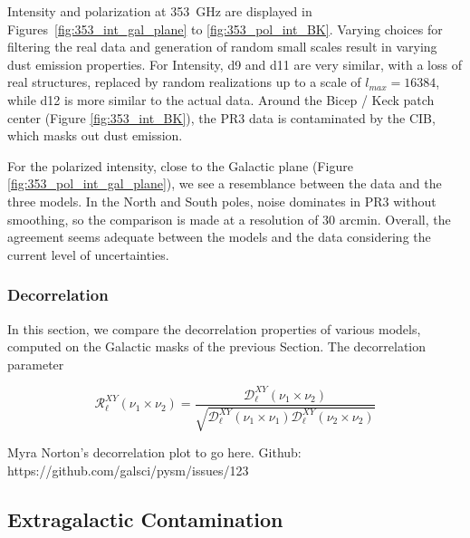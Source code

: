 \documentclass[twocolumn]{aastex631}
\begin{document}
Intensity and polarization at 353~GHz are displayed in Figures~\ref{fig:353_int_gal_plane} to \ref{fig:353_pol_int_BK}. Varying choices for filtering the real data and generation of random small scales result in varying dust emission properties. For Intensity, d9 and d11 are very similar, with a loss of real structures, replaced by random realizations up to a scale of $l_{max} = 16384$, while d12 is more similar to the actual data. 
Around the Bicep / Keck patch center (Figure \ref{fig:353_int_BK}), the PR3 data is contaminated by the CIB, which masks out dust emission. 

For the polarized intensity, close to the Galactic plane (Figure \ref{fig:353_pol_int_gal_plane}), we see a resemblance between the data and the three models. In the North and South poles, noise dominates in PR3 without smoothing, so the comparison is made at a resolution of 30 arcmin. Overall, the agreement seems adequate between the models and the data considering the current level of uncertainties. 


\subsubsection{Decorrelation} \label{sec:decorrelation}

In this section, we compare the decorrelation properties of various models, computed on the Galactic masks of the previous Section. The decorrelation parameter

\begin{equation}
    \mathcal{R}^{XY}_\ell(\nu_1\times\nu_2) = \frac{\mathcal{D}_\ell^{XY}(\nu_1\times\nu_2)}{\sqrt{\mathcal{D}_\ell^{XY}(\nu_1\times\nu_1)\mathcal{D}_\ell^{XY}(\nu_2\times\nu_2)}}
\end{equation}

Myra Norton's decorrelation plot to go here. Github: https://github.com/galsci/pysm/issues/123

\subsection{Extragalactic Contamination} \label{sec:CIBcontamination}

\end{document}
